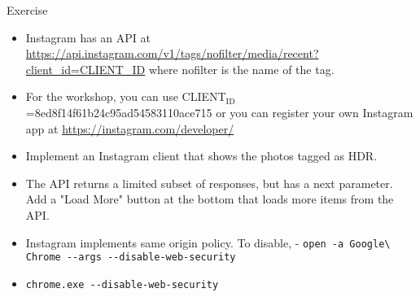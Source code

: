 \documentclass[presentation]{beamer}
\begin{document}
\begin{frame}[fragile,label=sec-8]{Exercise}
 \begin{itemize}
\item Instagram has an API at \url{https://api.instagram.com/v1/tags/nofilter/media/recent?client_id=CLIENT_ID} where nofilter is the name of the tag.
\item For the workshop, you can use CLIENT$_{\text{ID}}$=8ed8f14f61b24c95ad54583110ace715 or you can register your own Instagram app at \url{https://instagram.com/developer/}
\item Implement an Instagram client that shows the photos tagged as HDR.
\item The API returns a limited subset of responses, but has a next parameter. Add a "Load More" button at the bottom that loads more items from the API.
\item Instagram implements same origin policy. To disable, - \verb~open -a Google\ Chrome --args --disable-web-security~
\item \texttt{chrome.exe -{}-disable-web-security}
\end{itemize}
\end{frame}
\end{document}

